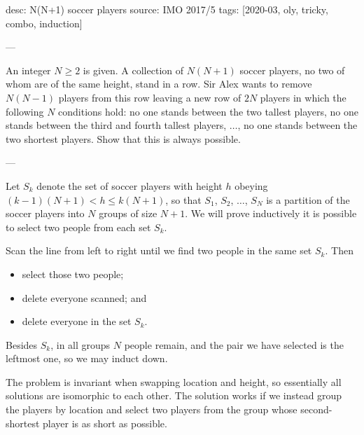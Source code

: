 desc: N(N+1) soccer players
source: IMO 2017/5
tags: [2020-03, oly, tricky, combo, induction]

---

An integer $N\ge2$ is given. A collection of $N(N+1)$ soccer players, no two of whom are of the same height, stand in a row. Sir Alex wants to remove $N(N-1)$ players from this row leaving a new row of $2N$ players in which the following $N$ conditions hold: no one stands between the two tallest players, no one stands between the third and fourth tallest players, $\ldots$, no one stands between the two shortest players. Show that this is always possible.

---

Let $S_k$ denote the set of soccer players with height $h$ obeying $(k-1)(N+1)<h\le k(N+1)$, so that $S_1$, $S_2$, $\ldots$, $S_N$ is a partition of the soccer players into $N$ groups of size $N+1$. We will prove inductively it is possible to select two people from each set $S_k$.

Scan the line from left to right until we find two people in the same set $S_k$. Then
\begin{itemize}[itemsep=0em]
\item select those two people;
\item delete everyone scanned; and
\item delete everyone in the set $S_k$.
\end{itemize}
Besides $S_k$, in all groups $N$ people remain, and the pair we have selected is the leftmost one, so we may induct down.
\begin{remark}
    The problem is invariant when swapping location and height, so essentially all solutions are isomorphic to each other. The solution works if we instead group the players by location and select two players from the group whose second-shortest player is as short as possible.
\end{remark}
